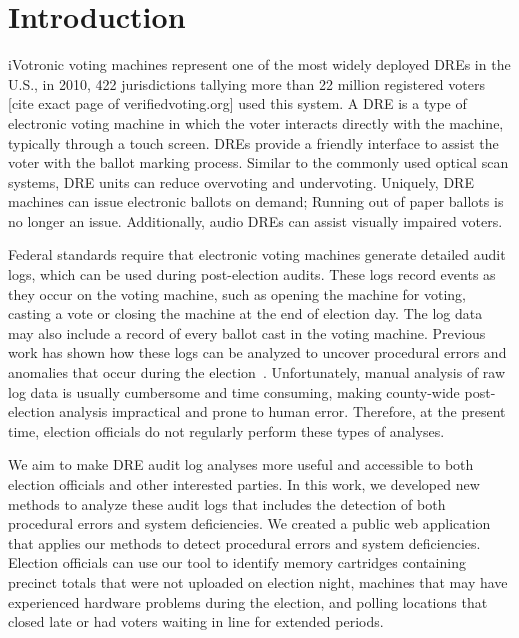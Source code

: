\section{Introduction}

iVotronic voting machines represent one of the most widely deployed DREs in the U.S., in 2010, 422 jurisdictions tallying more than 22 million registered voters [cite exact page of verifiedvoting.org] used this system. A DRE is a type of electronic voting machine in which the voter interacts directly with the machine, typically through a touch screen. DREs provide a friendly interface to assist the voter with the ballot marking process. Similar to the commonly used optical scan systems, DRE units can reduce overvoting and undervoting. Uniquely, DRE machines can issue electronic ballots on demand; Running out of paper ballots is no longer an issue. Additionally, audio DREs can assist visually impaired voters.
 
Federal standards require that electronic voting machines generate detailed audit logs, which can be used during post-election audits. These logs record events as they occur on the voting machine, such as opening the machine for voting, casting a vote or closing the machine at the end of election day. The log data may also include a record of every ballot cast in the voting machine.  Previous work has shown how these logs can be analyzed to uncover procedural errors and anomalies that occur during the election~\cite{Buell2011}.  Unfortunately, manual analysis of raw log data is usually cumbersome and time consuming, making county-wide post-election analysis impractical and prone to human error. Therefore, at the present time, election officials do not regularly perform these types of analyses. 

We aim to make DRE audit log analyses more useful and accessible to both election officials and other interested parties. In this work, we developed new methods to analyze these audit logs that includes the detection of both procedural errors and system deficiencies. We created a public web application that applies our methods to detect procedural errors and system deficiencies.  Election officials can use our tool to identify memory cartridges containing precinct totals that were not uploaded on election night, machines that may have experienced hardware problems during the election, and polling locations that closed late or had voters waiting in line for extended periods.
 
